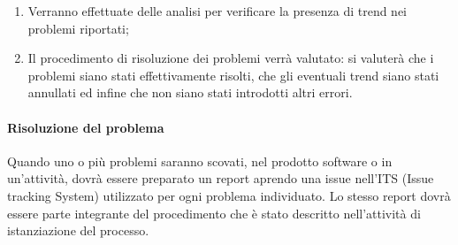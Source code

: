 \begin{enumerate}
				\item Verranno effettuate delle analisi per verificare la presenza di trend nei problemi riportati;

				\item Il procedimento di risoluzione dei problemi verrà valutato: si valuterà che i problemi siano stati effettivamente risolti, che gli eventuali trend siano stati annullati ed infine che non siano stati introdotti altri errori.
			\end{enumerate}
		\paragraph{Risoluzione del problema}
			Quando uno o più problemi saranno scovati, nel prodotto software o in un'attività, dovrà essere preparato un report aprendo una issue nell'ITS (Issue tracking System) utilizzato per ogni problema individuato. Lo stesso report dovrà essere parte integrante del procedimento che è stato descritto nell'attività di istanziazione del processo.
